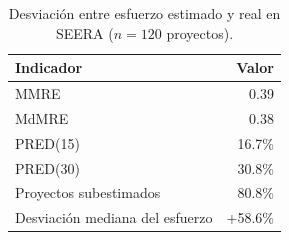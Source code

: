 \begin{table}[t]
\centering
\caption{Desviaci\'on entre esfuerzo estimado y real en SEERA ($n=120$ proyectos).}
\label{tab:seera}
\small
\begin{tabular}{lr}
\toprule
Indicador & Valor \\
\midrule
MMRE & 0.39 \\
MdMRE & 0.38 \\
PRED(15) & 16.7\% \\
PRED(30) & 30.8\% \\
Proyectos subestimados & 80.8\% \\
Desviaci\'on mediana del esfuerzo & +58.6\% \\
\bottomrule
\end{tabular}
\end{table}
